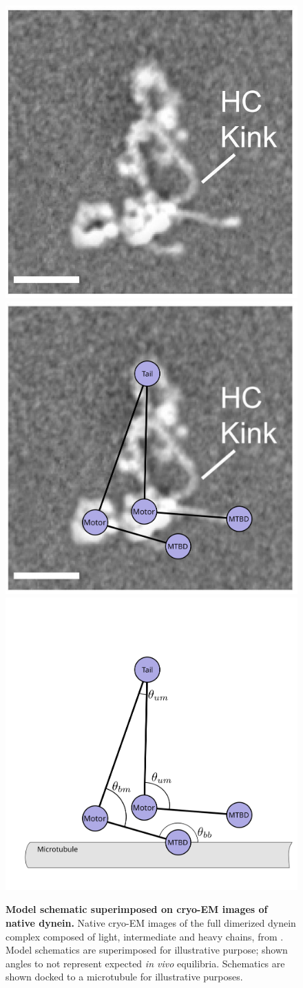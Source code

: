 \documentclass[9pt,twocolumn,twoside]{pnas-new}
\begin{document}
\begin{figure}[tbhp]
   \includegraphics[width=0.3\columnwidth]{figures/schematic-2-cryoem}
   \includegraphics[width=0.3\columnwidth]{figures/schematic-2-superimposed}
   \includegraphics[width=0.3\columnwidth]{figures/schematic-2-model}
   \caption{\textbf{Model schematic superimposed on cryo-EM images of
       native dynein.} Native cryo-EM images of the full dimerized
     dynein complex composed of light, intermediate and heavy chains,
     from \cite{nativestructure}. Model schematics are superimposed
     for illustrative purpose; shown angles to not represent expected
     \textit{in vivo} equilibria. Schematics are shown docked to a
     microtubule for illustrative purposes.}
   \label{fig:modelparams}
\end{figure}
\end{document}
